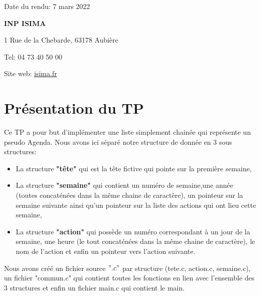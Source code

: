 \documentclass[12pt,french]{article} %
\begin{document}
\begin{titlepage}
\begin{flushright}
    Date du rendu: 7 mars 2022
    
    
  \end{flushright}
  
  \begin{flushleft}\small %
    \textbf{INP ISIMA}
    \footnotesize
    
    1 Rue de la Chebarde, 63178 Aubière
    
    Tel: 04 73 40 50 00
    
    Site web: \href{https://www.isima.fr/}{isima.fr}\newline 	
  \end{flushleft}
\end{titlepage}	

\renewcommand{\contentsname}{Sommaire}
\normalsize\tableofcontents %

\vspace{0.5cm}

\section{Présentation du TP}

Ce TP a pour but d'implémenter une liste simplement chainée qui représente un pseudo Agenda. Nous avons ici séparé notre structure de donnée en 3 sous structures:\newline

\begin{itemize}
	\item La structure \textbf{"tête"} qui est la tête fictive qui pointe sur la première semaine,
	\item La structure \textbf{"semaine"} qui contient un numéro de semaine,une année (toutes concaténées dans la même chaine de caractère), un pointeur sur la semaine suivante ainsi qu'un pointeur sur la liste des actions qui ont lieu cette semaine,
	\item La structure \textbf{"action"} qui possède un numéro correspondant à un jour de la semaine, une heure (le tout concaténées dans la même chaine de caractère), le nom de l'action et enfin un pointeur vers l'action suivante.\newline
\end{itemize}

Nous avons créé un fichier source $".c"$ par structure (tete.c, action.c, semaine.c), un fichier "commun.c" qui contient toutes les fonctions en lien avec l'ensemble des 3 structures et enfin un fichier main.c qui contient le main. 
\newline
\end{document}
